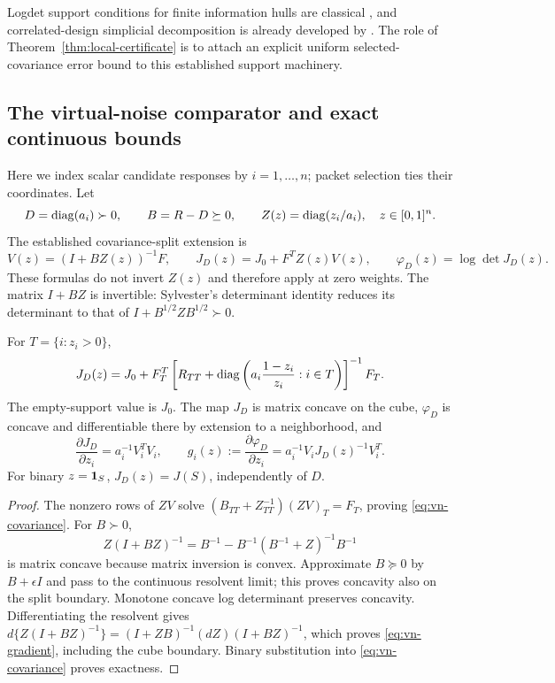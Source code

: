 Logdet support conditions for finite information hulls are classical
\citep{HarmanTrnovska2009}, and correlated-design simplicial decomposition is
already developed by \citet[Section 4.4]{Hainy2025}. The role of
Theorem~\ref{thm:local-certificate} is to attach an explicit uniform
selected-covariance error bound to this established support machinery.

\subsection{The virtual-noise comparator and exact continuous bounds}
\label{subsec:virtual-noise}
Here we index scalar candidate responses by $i=1,\ldots,n$; packet
selection ties their coordinates. Let
\[
 D=\operatorname{diag}(a_i)\succ0,\qquad B=R-D\succeq0,
 \qquad Z(z)=\operatorname{diag}(z_i/a_i),\quad z\in[0,1]^n.
\]
The established covariance-split extension is
\begin{equation}\label{eq:vn-resolvent}
 V(z)=(I+BZ(z))^{-1}F,\qquad
 J_D(z)=J_0+F^T Z(z)V(z),\qquad \varphi_D(z)=\log\det J_D(z).
\end{equation}
These formulas do not invert $Z(z)$ and therefore apply at zero weights.
The matrix $I+BZ$ is invertible: Sylvester's determinant identity reduces
its determinant to that of $I+B^{1/2}ZB^{1/2}\succ0$.

\begin{proposition}
\label{prop:vn}
For $T=\{i:z_i>0\}$,
\begin{equation}\label{eq:vn-covariance}
 J_D(z)=J_0+F_T^T
 \left[R_{TT}+\operatorname{diag}\left(a_i\frac{1-z_i}{z_i}:i\in T\right)\right]^{-1}F_T.
\end{equation}
The empty-support value is $J_0$. The map $J_D$ is matrix concave on the
cube, $\varphi_D$ is concave and differentiable there by extension to a
neighborhood, and
\begin{equation}\label{eq:vn-gradient}
 \frac{\partial J_D}{\partial z_i}=a_i^{-1}V_i^TV_i,\qquad
 g_i(z):=\frac{\partial\varphi_D}{\partial z_i}
       =a_i^{-1}V_iJ_D(z)^{-1}V_i^T.
\end{equation}
For binary $z=\mathbf 1_S$, $J_D(z)=J(S)$, independently of $D$.
\end{proposition}
\begin{proof}
The nonzero rows of $ZV$ solve
$(B_{TT}+Z_{TT}^{-1})(ZV)_T=F_T$, proving
\eqref{eq:vn-covariance}. For $B\succ0$,
\[
 Z(I+BZ)^{-1}=B^{-1}-B^{-1}(B^{-1}+Z)^{-1}B^{-1}
\]
is matrix concave because matrix inversion is convex. Approximate
$B\succeq0$ by $B+\epsilon I$ and pass to the continuous resolvent limit;
this proves concavity also on the split boundary. Monotone concave log
determinant preserves concavity. Differentiating the resolvent gives
$d\{Z(I+BZ)^{-1}\}=(I+ZB)^{-1}(dZ)(I+BZ)^{-1}$,
which proves \eqref{eq:vn-gradient}, including the cube boundary.
Binary substitution into \eqref{eq:vn-covariance} proves exactness.
\end{proof}

